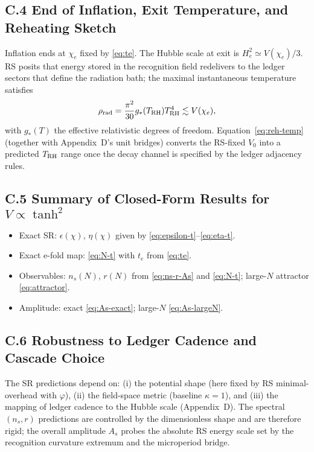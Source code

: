 \documentclass[11pt]{article}
\theoremstyle{definition}
\theoremstyle{remark}
\begin{document}
\subsection*{C.4 End of Inflation, Exit Temperature, and Reheating Sketch}
Inflation ends at $\chi_e$ fixed by \eqref{eq:te}. The Hubble scale at exit is $H_e^2\simeq V(\chi_e)/3$. RS posits that energy stored in the recognition field redelivers to the ledger sectors that define the radiation bath; the maximal instantaneous temperature satisfies
\begin{equation}
\rho_{\rm rad}=\frac{\pi^2}{30}g_*(T_{\rm RH})T_{\rm RH}^4 \lesssim V(\chi_e),
\label{eq:reh-temp}
\end{equation}
with $g_*(T)$ the effective relativistic degrees of freedom. Equation~\eqref{eq:reh-temp} (together with Appendix~D's unit bridges) converts the RS-fixed $V_0$ into a predicted $T_{\rm RH}$ range once the decay channel is specified by the ledger adjacency rules.

\subsection*{C.5 Summary of Closed-Form Results for $V\propto\tanh^2$}
\begin{itemize}
\item Exact SR: $\epsilon(\chi)$, $\eta(\chi)$ given by \eqref{eq:epsilon-t}--\eqref{eq:eta-t}.
\item Exact e-fold map: \eqref{eq:N-t} with $t_e$ from \eqref{eq:te}.
\item Observables: $n_s(N)$, $r(N)$ from \eqref{eq:ns-r-As} and \eqref{eq:N-t}; large-$N$ attractor \eqref{eq:attractor}.
\item Amplitude: exact \eqref{eq:As-exact}; large-$N$ \eqref{eq:As-largeN}.
\end{itemize}

\subsection*{C.6 Robustness to Ledger Cadence and Cascade Choice}
The SR predictions depend on: (i) the potential shape (here fixed by RS minimal-overhead with $\varphi$), (ii) the field-space metric (baseline $\kappa=1$), and (iii) the mapping of ledger cadence to the Hubble scale (Appendix~D). The spectral $(n_s,r)$ predictions are controlled by the dimensionless shape and are therefore rigid; the overall amplitude $A_s$ probes the absolute RS energy scale set by the recognition curvature extremum and the microperiod bridge.
\end{document}
